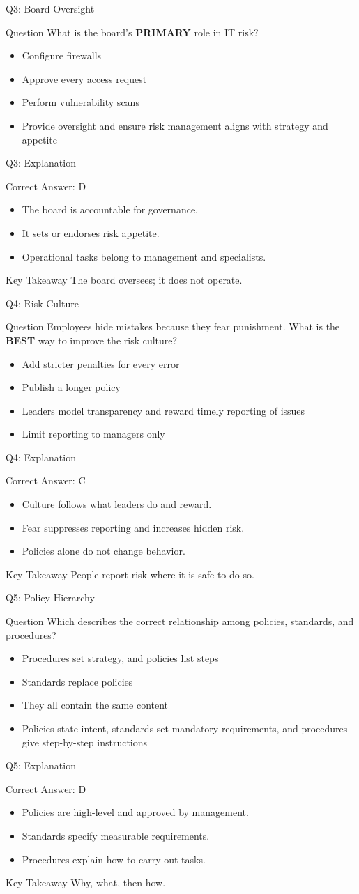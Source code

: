 \documentclass[aspectratio=169]{beamer}
\newcommand{\hq}[7]{%
	\begin{frame}{Q#1: #2}
		\begin{block}{Question}
			#3
		\end{block}
		\begin{itemize}
			#4
		\end{itemize}
	\end{frame}
	\begin{frame}{Q#1: Explanation}
		\begin{block}{Correct Answer: #5}
			\begin{itemize}
				#6
			\end{itemize}
		\end{block}
		\begin{alertblock}{Key Takeaway}
			#7
		\end{alertblock}
	\end{frame}
}
\begin{document}
	\hq{3}{Board Oversight}
	{What is the board's \textbf{PRIMARY} role in IT risk?}
	{\item[\textbf{(A)}] Configure firewalls
		\item[\textbf{(B)}] Approve every access request
		\item[\textbf{(C)}] Perform vulnerability scans
		\item[\textbf{(D)}] Provide oversight and ensure risk management aligns with strategy and appetite}
	{D}
	{\item The board is accountable for governance.
		\item It sets or endorses risk appetite.
		\item Operational tasks belong to management and specialists.}
	{The board oversees; it does not operate.}
	
	\hq{4}{Risk Culture}
	{Employees hide mistakes because they fear punishment. What is the \textbf{BEST} way to improve the risk culture?}
	{\item[\textbf{(A)}] Add stricter penalties for every error
		\item[\textbf{(B)}] Publish a longer policy
		\item[\textbf{(C)}] Leaders model transparency and reward timely reporting of issues
		\item[\textbf{(D)}] Limit reporting to managers only}
	{C}
	{\item Culture follows what leaders do and reward.
		\item Fear suppresses reporting and increases hidden risk.
		\item Policies alone do not change behavior.}
	{People report risk where it is safe to do so.}
	
	\hq{5}{Policy Hierarchy}
	{Which describes the correct relationship among policies, standards, and procedures?}
	{\item[\textbf{(A)}] Procedures set strategy, and policies list steps
		\item[\textbf{(B)}] Standards replace policies
		\item[\textbf{(C)}] They all contain the same content
		\item[\textbf{(D)}] Policies state intent, standards set mandatory requirements, and procedures give step-by-step instructions}
	{D}
	{\item Policies are high-level and approved by management.
		\item Standards specify measurable requirements.
		\item Procedures explain how to carry out tasks.}
	{Why, what, then how.}
	
\end{document}
